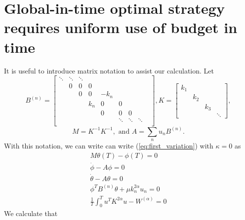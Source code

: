 \section{Global-in-time optimal strategy requires uniform use of budget in time}
\label{appendix:budget_conservation}

It is useful to introduce matrix notation to assist our calculation.  Let 
\begin{equation}
B^{(n)} =
 \begin{bmatrix}
\ddots&\ddots &\ddots & &   &   &  & \\
&0  &0&0 &   &   &  & \\
& & 0& 0 &-k_{n} &  & & \\
& & & k_{n} & 0 &0 & & \\
& & & & 0 & 0 &0 &  \\
& & &  & &  \ddots &  \ddots & \ddots  & \\
 \end{bmatrix},
 K =
 \begin{bmatrix}
 k_{1} & & &    \\
 & k_{2} & &   \\
 & & k_{3} & \\
 & & &  \ddots  
 \end{bmatrix} ,
\end{equation}
\begin{equation}
M = K^{-1}K^{-1}, \text{ and } A = \sum_{n} u_{n}B^{(n)}.
\end{equation}
With this notation, we can write can write (\ref{eq:first_variation}) with $\kappa = 0$ as 
\begin{subequations}
	\begin{align}
	\label{eq:matrix_terminal}
	 M\theta(T) - \phi(T) = 0 \\
	 \label{eq:matrix_adj}
	 \dot{\phi} - A\phi = 0	\\
	 \label{eq:matrix_state}
	 \dot{\theta} - A\theta = 0	\\
	 \label{eq:matrix_opt}
	 \phi^{T}B^{(n)}\theta + \mu k_{n}^{2\alpha}u_{n} = 0 \\
	 \frac{1}{T}\int_{0}^T u^{T}K^{2\alpha}u -W^{(\alpha)} = 0
	\end{align}
\end{subequations}
We calculate that
